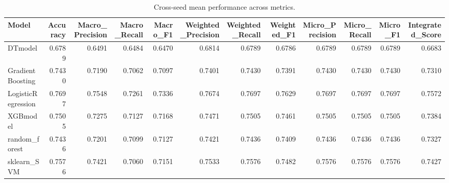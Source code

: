 \begin{table}[t]
\centering
\begin{tabular}{lrrrrrrrrrrr}
\toprule
Model & Accuracy & Macro_Precision & Macro_Recall & Macro_F1 & Weighted_Precision & Weighted_Recall & Weighted_F1 & Micro_Precision & Micro_Recall & Micro_F1 & Integrated_Score \\
\midrule
DTmodel & 0.6789 & 0.6491 & 0.6484 & 0.6470 & 0.6814 & 0.6789 & 0.6786 & 0.6789 & 0.6789 & 0.6789 & 0.6683 \\
GradientBoosting & 0.7430 & 0.7190 & 0.7062 & 0.7097 & 0.7401 & 0.7430 & 0.7391 & 0.7430 & 0.7430 & 0.7430 & 0.7310 \\
LogisticRegression & 0.7697 & 0.7548 & 0.7261 & 0.7336 & 0.7674 & 0.7697 & 0.7629 & 0.7697 & 0.7697 & 0.7697 & 0.7572 \\
XGBmodel & 0.7505 & 0.7275 & 0.7127 & 0.7168 & 0.7471 & 0.7505 & 0.7461 & 0.7505 & 0.7505 & 0.7505 & 0.7384 \\
random_forest & 0.7436 & 0.7201 & 0.7099 & 0.7127 & 0.7421 & 0.7436 & 0.7409 & 0.7436 & 0.7436 & 0.7436 & 0.7327 \\
sklearn_SVM & 0.7576 & 0.7421 & 0.7060 & 0.7151 & 0.7533 & 0.7576 & 0.7482 & 0.7576 & 0.7576 & 0.7576 & 0.7427 \\
\bottomrule
\end{tabular}
\caption{Cross-seed mean performance across metrics.}
\label{tab:cross_seed_mean}
\end{table}